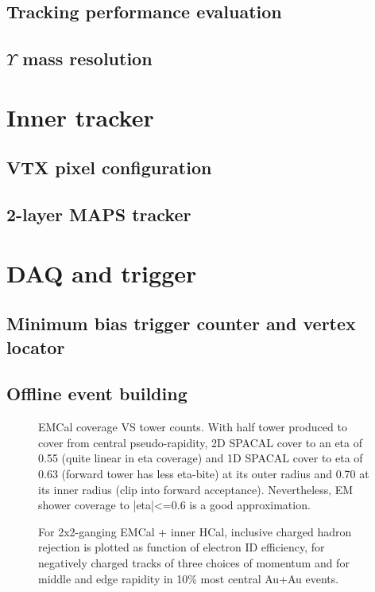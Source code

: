\subsection{Tracking performance evaluation}
\subsection{$\Upsilon$ mass resolution}


\section{Inner tracker}
\label{sec:innertracker}
\subsection{VTX pixel configuration}
\subsection{2-layer MAPS tracker}
\section{DAQ and trigger}
\subsection{Minimum bias trigger counter and vertex locator}
\subsection{Offline event building}


\begin{figure}[hbt]
  \centering
  \caption{EMCal coverage VS tower counts. With half tower produced to cover from central pseudo-rapidity, 2D SPACAL cover to an eta of 0.55 (quite linear in eta coverage) and 1D SPACAL cover to eta of 0.63 (forward tower has less eta-bite) at its outer radius and 0.70 at its inner radius (clip into forward acceptance). Nevertheless, EM shower coverage to |eta|<=0.6 is a good approximation.}
  \label{fig:eta_tower_fraction}
\end{figure}

\begin{figure}[hbt]
  \centering
  \caption{For 2x2-ganging EMCal + inner HCal, inclusive charged
    hadron rejection is plotted as function of electron ID efficiency,
    for negatively charged tracks of three choices of momentum and for
    middle and edge rapidity in 10\% most central Au+Au events.}
  \label{fig:eid_auau}
\end{figure}

